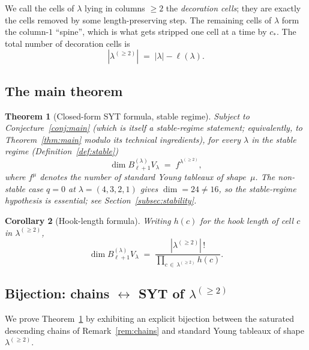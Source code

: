 \documentclass[11pt]{article}
\newtheorem{theorem}{Theorem}
\newtheorem{corollary}[theorem]{Corollary}
\theoremstyle{definition}
\begin{document}
\noindent We call the cells of $\lambda$ lying in columns $\ge 2$ the
\emph{decoration cells}; they are exactly the cells removed by some
length-preserving step. The remaining cells of $\lambda$ form the
column-$1$ ``spine'', which is what gets stripped one cell at a time by
$c_*$. The total number of decoration cells is
\[
   |\lambda^{(\ge 2)}| \;=\; |\lambda| - \ell(\lambda).
\]

\subsection{The main theorem}

\begin{theorem}[Closed-form SYT formula, stable regime]\label{thm:syt}
Subject to Conjecture~\ref{conj:main} (which is itself a stable-regime
statement; equivalently, to Theorem~\ref{thm:main} modulo its
technical ingredients), for every $\lambda$ in the stable regime
(Definition~\ref{def:stable})
\begin{equation}\label{eq:syt}
   \dim B_{\ell + 1}^{(\lambda)} V_\lambda
   \;=\;
   f^{\lambda^{(\ge 2)}},
\end{equation}
where $f^\mu$ denotes the number of standard Young tableaux of
shape~$\mu$. \emph{The non-stable case $q = 0$ at $\lambda = (4, 3, 2, 1)$
gives $\dim = 24 \ne 16$, so the stable-regime hypothesis is essential;
see Section~\ref{subsec:stability}.}
\end{theorem}

\begin{corollary}[Hook-length formula]\label{cor:hook-length}
Writing $h(c)$ for the hook length of cell $c$ in $\lambda^{(\ge 2)}$,
\begin{equation}\label{eq:hook}
   \dim B_{\ell + 1}^{(\lambda)} V_\lambda
   \;=\;
   \frac{|\lambda^{(\ge 2)}|\,!}{\displaystyle\prod_{c \,\in\, \lambda^{(\ge 2)}} h(c)}.
\end{equation}
\end{corollary}

\subsection{Bijection: chains $\leftrightarrow$ SYT of $\lambda^{(\ge 2)}$}

We prove Theorem~\ref{thm:syt} by exhibiting an explicit bijection
between the saturated descending chains of Remark~\ref{rem:chains} and
standard Young tableaux of shape $\lambda^{(\ge 2)}$.
\end{document}
